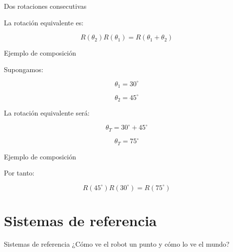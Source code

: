 \documentclass[aspectratio=169]{beamer}
\begin{document}
\begin{frame}{Dos rotaciones consecutivas}

    La rotación equivalente es:

    \[
    \boxed{
        R(\theta_2)R(\theta_1)
        =
        R(\theta_1+\theta_2)
    }
    \]

    \vspace{0.3cm}


\end{frame}

\begin{frame}{Ejemplo de composición}

    Supongamos:

    \[
    \theta_1=30^\circ
    \]

    \[
    \theta_2=45^\circ
    \]

    La rotación equivalente será:

    \[
    \theta_T
    =
    30^\circ+45^\circ
    \]

    \[
    \boxed{
        \theta_T=75^\circ
    }
    \]

\end{frame}

\begin{frame}{Ejemplo de composición}

    Por tanto:

    \[
    R(45^\circ)R(30^\circ)
    =
    R(75^\circ)
    \]

    \vspace{0.3cm}


\end{frame}

\section{Sistemas de referencia}

\SectionSlide
{Sistemas de referencia}
{¿Cómo ve el robot un punto y cómo lo ve el mundo?}
\end{document}
